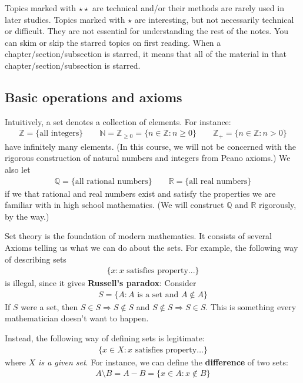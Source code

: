 \documentclass[12pt,b5paper,notitlepage]{article}
\theoremstyle{definition}
\theoremstyle{plain}
\newcommand{\Nbb}{\mathbb N}
\newcommand{\Zbb}{\mathbb Z}
\newcommand{\Qbb}{\mathbb Q}
\newcommand{\Rbb}{\mathbb R}
\numberwithin{equation}{section}
\begin{document}
Topics marked with $\star\star$ are technical and/or their methods are rarely used in later studies. Topics marked with $\star$ are interesting, but not necessarily technical or difficult. They are not essential for understanding the rest of the notes. You can skim or skip the starred topics on first reading. When a chapter/section/subsection is starred, it means that all of the material in that chapter/section/subsection is starred.




\subsection{Basic operations and axioms}
Intuitively, a set denotes a collection of elements. For instance:\index{N@$\Nbb=\{0,1,2,\dots\}$} \index{Z@$\Zbb_+=\{1,2,\dots\}$}
\begin{gather*}
\Zbb=\{\text{all integers}\}\qquad \Nbb=\Zbb_{\geq0}=\{n\in\Zbb:n\geq0\}\qquad \Zbb_+=\{n\in\Zbb:n>0\}
\end{gather*}
have infinitely many elements. (In this course, we will not be concerned with the rigorous construction of natural numbers and integers from Peano axioms.) We also let
\begin{align*}
\Qbb=\{\text{all rational numbers}\}\qquad\Rbb=\{\text{all real numbers}\}
\end{align*}
if we that rational and real numbers exist and satisfy the properties we are familiar with in high school mathematics. (We will construct $\Qbb$ and $\Rbb$ rigorously, by the way.)


Set theory is the foundation of modern mathematics. It consists of several Axioms telling us what we can do about the sets. For example, the following way of describing sets
\begin{align}
\{x: x\text{ satisfies property...}\}  \label{eq1}
\end{align}
is illegal, since it gives \textbf{Russell's paradox}: Consider
\begin{align}
S=\{A: A\text{ is a set and }A\notin A\}\label{eq12}
\end{align}
If $S$ were a set, then $S\in S\Rightarrow S\notin S$ and $S\notin S\Rightarrow S\in S$. This is something every mathematician doesn't want to happen.

Instead, the following way of defining sets is legitimate:
\begin{align}
\{x\in X:x\text{ satisfies property}\dots\}  \label{eq2}
\end{align}
where \textit{$X$ is a given set}.  For instance, we can define the \textbf{difference} of two sets:
\begin{align*}
A\setminus B=A-B=\{x\in A:x\notin B\}
\end{align*}
\end{document}
